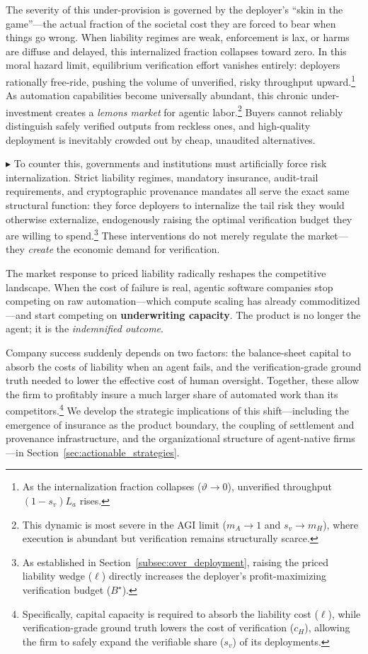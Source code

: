 \documentclass[12pt, letter]{article}
\begin{document}
The severity of this under-provision is governed by the deployer's ``skin in the game''---the actual fraction of the societal cost they are forced to bear when things go wrong. When liability regimes are weak, enforcement is lax, or harms are diffuse and delayed, this internalized fraction collapses toward zero. In this moral hazard limit, equilibrium verification effort vanishes entirely: deployers rationally free-ride, pushing the volume of unverified, risky throughput upward.\footnote{As the internalization fraction collapses ($\vartheta\to 0$), unverified throughput $(1-s_v)L_a$ rises.} As automation capabilities become universally abundant, this chronic under-investment creates a \emph{lemons market} for agentic labor.\footnote{This dynamic is most severe in the AGI limit ($m_A\to 1$ and $s_v\to m_H$), where execution is abundant but verification remains structurally scarce.} Buyers cannot reliably distinguish safely verified outputs from reckless ones, and high-quality deployment is inevitably crowded out by cheap, unaudited alternatives.

$\blacktriangleright$ To counter this, governments and institutions must artificially force risk internalization. Strict liability regimes, mandatory insurance, audit-trail requirements, and cryptographic provenance mandates all serve the exact same structural function: they force deployers to internalize the tail risk they would otherwise externalize, endogenously raising the optimal verification budget they are willing to spend.\footnote{As established in Section~\ref{subsec:over_deployment}, raising the priced liability wedge ($\ell$) directly increases the deployer's profit-maximizing verification budget ($B^\star$).} These interventions do not merely regulate the market---they \emph{create} the economic demand for verification.

The market response to priced liability radically reshapes the competitive landscape. When the cost of failure is real, agentic software companies stop competing on raw automation---which compute scaling has already commoditized---and start competing on \textbf{underwriting capacity}. The product is no longer the agent; it is the \emph{indemnified outcome}. 

Company success suddenly depends on two factors: the balance-sheet capital to absorb the costs of liability when an agent fails, and the verification-grade ground truth needed to lower the effective cost of human oversight. Together, these allow the firm to profitably insure a much larger share of automated work than its competitors.\footnote{Specifically, capital capacity is required to absorb the liability cost ($\ell$), while verification-grade ground truth lowers the cost of verification ($c_H$), allowing the firm to safely expand the verifiable share ($s_v$) of its deployments.} We develop the strategic implications of this shift---including the emergence of insurance as the product boundary, the coupling of settlement and provenance infrastructure, and the organizational structure of agent-native firms---in Section~\ref{sec:actionable_strategies}.
\end{document}
